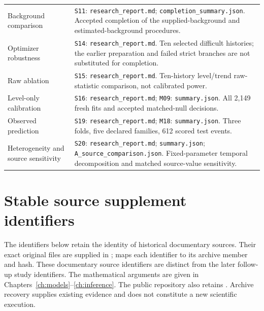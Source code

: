 \begin{longtable}{@{}>{\raggedright\arraybackslash}p{}>{\raggedright\arraybackslash}p{}@{}}
Background comparison & \texttt{S11}: \nolinkurl{research_report.md}; \nolinkurl{completion_summary.json}. Accepted completion of the supplied-background and estimated-background procedures. \\
Optimizer robustness & \texttt{S14}: \nolinkurl{research_report.md}. Ten selected difficult histories; the earlier preparation and failed strict branches are not substituted for completion. \\
Raw ablation & \texttt{S15}: \nolinkurl{research_report.md}. Ten-history level/trend raw-statistic comparison, not calibrated power. \\
Level-only calibration & \texttt{S16}: \nolinkurl{research_report.md}; \texttt{M09}: \nolinkurl{summary.json}. All 2,149 fresh fits and accepted matched-null decisions. \\
Observed prediction & \texttt{S19}: \nolinkurl{research_report.md}; \texttt{M18}: \nolinkurl{summary.json}. Three folds, five declared families, 612 scored test events. \\
Heterogeneity and source sensitivity & \texttt{S20}: \nolinkurl{research_report.md}; \nolinkurl{summary.json}; \nolinkurl{A_source_comparison.json}. Fixed-parameter temporal decomposition and matched source-value sensitivity. \\
\bottomrule
\end{longtable}


\section{Stable source supplement identifiers}\label{sec:source-supplements}
The identifiers below retain the identity of historical documentary sources. Their exact original files are supplied in ;  maps each identifier to its archive member and hash. These documentary source identifiers are distinct from the later follow-up study identifiers. The mathematical arguments are given in Chapters~\ref{ch:models}--\ref{ch:inference}. The public repository also retains . Archive recovery supplies existing evidence and does not constitute a new scientific execution.

